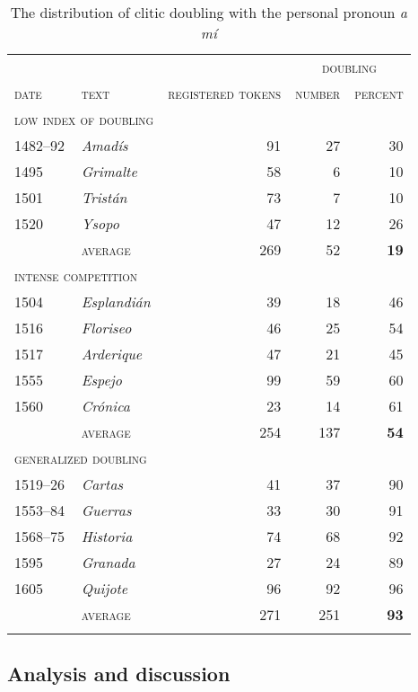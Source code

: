 \documentclass[output=paper]{LSP/langsci}
\begin{document}
\begin{table}
\caption{The distribution of clitic doubling with the personal pronoun \textit{a mí}}
\label{04-me-tab:2}
\begin{tabular}{llrrr}
\lsptoprule
& & & \multicolumn{2}{c}{\textsc{doubling}}\\\cmidrule(lr){4-5}
\textsc{date} & \textsc{text} & \textsc{registered tokens} & \textsc{number} & \textsc{percent}\\\midrule
\multicolumn{2}{l}{\textsc{low index of doubling}}\\
1482--92 & \textit{Amadís}   & 91 & 27 & 30\\ 
1495     & \textit{Grimalte} & 58 & 6  & 10\\ 
1501     & \textit{Tristán}  & 73 & 7  & 10\\ 
1520     & \textit{Ysopo}    & 47 & 12 & 26\\ 
\cmidrule(lr){3-5}
& \textsc{average} &269& 52 & \textbf{19}\\\midrule
\multicolumn{2}{l}{\textsc{intense competition}}\\
1504     & \textit{Esplandián} & 39 & 18 & 46\\ 
1516     & \textit{Floriseo}   & 46 & 25 & 54\\ 
1517     & \textit{Arderique}  & 47 & 21 & 45\\ 
1555     & \textit{Espejo}     & 99 & 59 & 60\\ 
1560     & \textit{Crónica}    & 23 & 14 & 61\\ 
\cmidrule(lr){3-5}
& \textsc{average} & 254 & 137 & \textbf{54}\\\midrule
\multicolumn{2}{l}{\textsc{generalized doubling}}\\
1519--26 & \textit{Cartas}   & 41 & 37 & 90\\ 
1553--84 & \textit{Guerras}  & 33 & 30 & 91\\ 
1568--75 & \textit{Historia} & 74 & 68 & 92\\ 
1595     & \textit{Granada}  & 27 & 24 & 89\\ 
1605     & \textit{Quijote}  & 96 & 92 & 96\\ 
\cmidrule(lr){3-5}
& \textsc{average} & 271 & 251& \textbf{93}\\
\lspbottomrule
\end{tabular}
\end{table}


\subsection{Analysis and discussion}
\label{04-me-sec:4.5}
\end{document}

